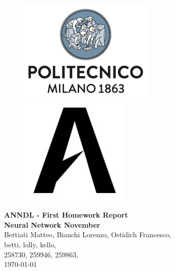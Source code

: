 \documentclass[11pt]{article}
\begin{document}
    
    \begin{figure}[H]
        \raggedright
        \includegraphics[scale=0.4]{images/polimi.png} \hfill \includegraphics[scale=0.3]{images/airlab.jpeg}
    \end{figure}
    
    \vspace{5mm}
    
    \begin{center}
        {\Large \textbf{ANNDL - First Homework Report}}\\
        \vspace{2mm}
        {\Large \textbf{Neural Network November}}\\
        \vspace{2mm}
        {\large Bettiati Matteo,}
        {\large Bianchi Lorenzo,}
        {\large Ostidich Francesco,}\\
        \vspace{2mm}
        {betti,}
        {lolly,}
        {kello,}\\
        \vspace{2mm}
        {258730,}
        {259946,}
        {259863,}\\
        \vspace{5mm}
        \today
    \end{center}    
    \vspace{5mm}
\end{document}
